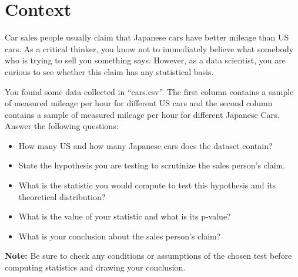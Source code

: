 \section*{Context}

Car sales people usually claim that Japanese cars have better mileage than US cars. As a critical thinker, you know not to immediately believe what somebody who is trying to sell you something says. However, as a data scientist,
you are curious to see whether this claim has any statistical basis. 

You found some data collected in “cars.csv”.  The first
column contains a sample of measured mileage per hour for different US cars and the second column contains a sample of measured mileage per hour for different Japanese Cars. 
Answer the following questions: 
\begin{itemize}
    \item[(a)] How many US and how many Japanese cars does the dataset contain? 
    \item[(b)] State the hypothesis you are testing to scrutinize the sales person's claim.
    \item[(c)] What is the statistic you would compute to test this hypothesis and its theoretical distribution?
    \item[(d)] What is the value of your statistic and what is its p-value?
    \item[(e)] What is your conclusion about the sales person's claim?
\end{itemize}
\textbf{Note:} Be sure to check any conditions or assumptions of the chosen test before computing statistics and drawing your conclusion.

\newpage
